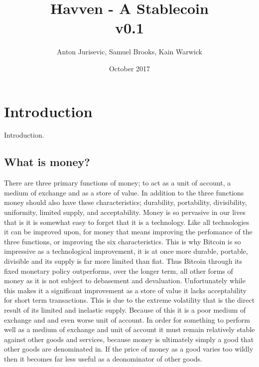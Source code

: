 \documentclass{article}
\begin{document}
\newcommand{\CUR}{\textsc{cur}}
\newcommand{\NOM}{\textsc{nom}}


\title{Havven - A Stablecoin \\ v0.1}
\author{Anton Jurisevic, Samuel Brooks, Kain Warwick}
\date{October 2017}


\begin{figure}
    \centering
%    
\end{figure}
\maketitle

\section{Introduction}

Introduction. \\

\subsection{What is money?}

There are three primary functions of money; to act as a unit of account, a medium of exchange and as a store of value. In addition to the three functions money should also have these characteristics; durability, portability, divisibility, uniformity, limited supply, and acceptability. Money is so pervasive in our lives that is it is somewhat easy to forget that it is a technology. Like all technologies it can be improved upon, for money that means improving the perfomance of the three functions, or improving the six characteristics. This is why Bitcoin is so impressive as a technological improvement, it is at once more durable, portable, divisible and its supply is far more limited than fiat. Thus Bitcoin through its fixed monetary policy outperforms, over the longer term, all other forms of money as it is not subject to debasement and devaluation. Unfortunately while this makes it a significant improvement as a store of value it lacks acceptability for short term transactions. This is due to the extreme volatility that is the direct result of its limited and inelastic supply. Because of this it is a poor medium of exchange and and even worse unit of account. In order for something to perform well as a medium of exchange and unit of account it must remain relatively stable against other goods and services, because money is ultimately simply a good that other goods are denominated in. If the price of money as a good varies too wildly then it becomes far less useful as a deonominator of other goods. \\
\end{document}
